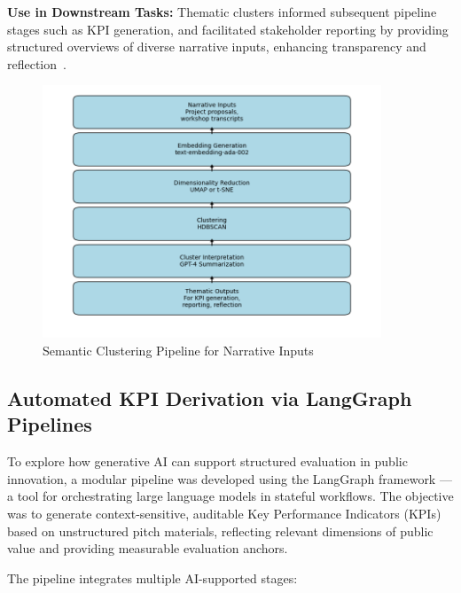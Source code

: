 \textbf{Use in Downstream Tasks:} Thematic clusters informed subsequent pipeline stages such as KPI generation, and facilitated stakeholder reporting by providing structured overviews of diverse narrative inputs, enhancing transparency and reflection~\citep{Braun2019ThematicAnalysis,Feng2019MixedMethodsNLP}.


\begin{figure}[H]
    \centering
    \includegraphics[width=0.9\textwidth]{../fig/clustering_pipeline}
    \caption{Semantic Clustering Pipeline for Narrative Inputs}
    \label{fig:clustering-pipeline}
\end{figure}


\subsection{Automated KPI Derivation via LangGraph Pipelines}\label{subsec:kpi-pipeline}

To explore how generative AI can support structured evaluation in public innovation, a modular pipeline was developed using the LangGraph framework — a tool for orchestrating large language models in stateful workflows.
The objective was to generate context-sensitive, auditable Key Performance Indicators (KPIs) based on unstructured pitch materials, reflecting relevant dimensions of public value and providing measurable evaluation anchors.

The pipeline integrates multiple AI-supported stages:

